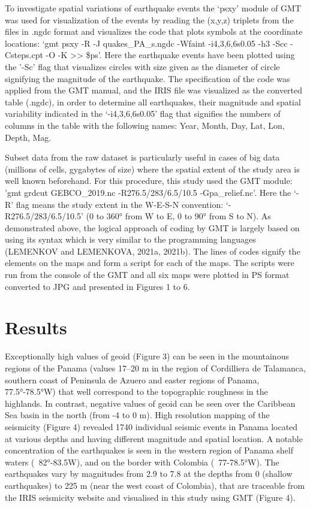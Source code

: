 \documentclass[10pt,twoside,twocolumn,a4paper]{article}
\begin{document}
To investigate spatial variations of earthquake events the ‘psxy’ module of GMT was used for visualization of the events by reading the (x,y,z) triplets from the files in .ngdc format and visualizes the code that plots symbols at the coordinate locations: ‘gmt psxy -R -J quakes\_PA\_s.ngdc -Wfaint -i4,3,6,6s0.05 -h3 -Scc -Csteps.cpt -O -K >> \$ps’. Here the earthquake events have been plotted using the '-Sc' flag that visualizes circles with size given as the diameter of circle signifying the magnitude of the earthquake. The specification of the code was applied from the GMT manual, and the IRIS file was visualized as the converted table (.ngdc), in order to determine all earthquakes, their magnitude and spatial variability indicated in the ‘-i4,3,6,6s0.05’ flag that signifies the numbers of columns in the table with the following names: Year, Month, Day, Lat, Lon, Depth, Mag. 

Subset data from the raw dataset is particularly useful in cases of big data (millions of cells, gygabytes of size) where the spatial extent of the study area is well known beforehand. For this procedure, this study used the GMT module: 'gmt grdcut GEBCO\_2019.nc -R276.5/283/6.5/10.5  -Gpa\_relief.nc'. Here the ‘-R’ flag means the study extent in the W-E-S-N convention: ‘-R276.5/283/6.5/10.5’ (0 to 360° from W to E, 0 to 90° from S to N). 
As demonstrated above, the logical approach of coding by GMT is largely based on using its syntax which is very similar to the programming languages (LEMENKOV and LEMENKOVA, 2021a, 2021b). The lines of codes signify the elements on the maps and form a script for each of the maps. The scripts were run from the console of the GMT and all six maps were plotted in PS format converted to JPG and presented in Figures 1 to 6.

\section{Results}

Exceptionally high values of geoid (Figure 3) can be seen in the mountainous regions of the Panama (values 17–20 m in the region of Cordilliera de Talamanca, southern coast of Peninsula de Azuero and easter regions of Panama, 77.5°-78.5°W) that well correspond to the topographic roughness in the highlands. In contrast, negative values of geoid can be seen over the Caribbean Sea basin in the north (from -4 to 0 m). 
High resolution mapping of the seismicity (Figure 4) revealed 1740 individual seismic events in Panama located at various depths and having different magnitude and spatial location. A notable concentration of the earthquakes is seen in the western region of Panama shelf waters (~82°-83.5W), and on the border with Colombia (~77-78.5°W). The earthquakes vary by magnitudes from 2.9 to 7.8 at the depths from 0 (shallow earthquakes) to 225 m (near the west coast of Colombia), that are traceable from the IRIS seismicity website and visualised in this study using GMT (Figure 4).
\end{document}
